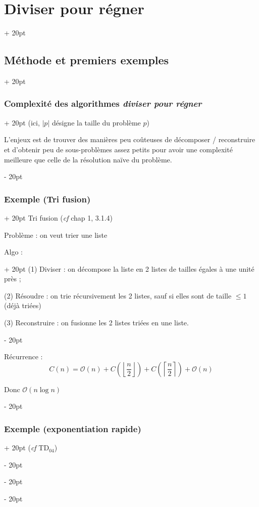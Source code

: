 \documentclass[a4paper, 12pt, twoside]{article}
\newcommand{\lr}[1]{\left( #1 \right)}
\newcommand{\abs}[1]{\left\lvert #1 \right\rvert} %
\newcommand{\floor}[1]{\left\lfloor #1 \right\rfloor}
\newcommand{\ceil}[1]{\left\lceil #1 \right\rceil}
\renewcommand{\le}{\leqslant}
\newcommand{\ind}[1][20pt]{\advance\leftskip + #1}
\newcommand{\deind}[1][20pt]{\advance\leftskip - #1}
\newenvironment{indt}[2][20pt]{#2 \par \ind[#1]}{\par \deind} %
\begin{document}
\begin{indt}{\section{Diviser pour régner}}
\begin{indt}{\subsection{Méthode et premiers exemples}}
\begin{indt}{\subsubsection{Complexité des algorithmes \textit{diviser pour régner}}}
                (ici, $\abs p$ désigne la taille du problème $p$)
                
                L'enjeux est de trouver des manières peu coûteuses de décomposer / reconstruire et d'obtenir peu de sous-problèmes assez petits pour avoir une complexité meilleure que celle de la résolution naïve du problème.
            \end{indt}
            
            \vspace{12pt}
            
            \begin{indt}{\subsubsection{Exemple (Tri fusion)}}
                Tri fusion (\textit{cf} chap 1, 3.1.4)
                
                \vspace{6pt}
                
                Problème : on veut trier une liste
                
                \vspace{6pt}
                
                \begin{indt}{Algo :}
                    (1) Diviser : on décompose la liste en 2 listes de tailles égales à une unité près ;
                    
                    (2) Résoudre : on trie récursivement les 2 listes, sauf si elles sont de taille $\le 1$ (déjà triées)
                    
                    (3) Reconstruire : on fusionne les 2 listes triées en une liste.
                \end{indt}
                
                \vspace{6pt}
                
                Récurrence :
                    \[ C(n) = \mathcal O(n) + C\lr{\floor{\dfrac n 2}} + C\lr{\ceil{\dfrac n 2}} + \mathcal O(n) \]
                
                Donc $\mathcal O(n \log n)$
            \end{indt}
            
            \vspace{12pt}
            
            \begin{indt}{\subsubsection{Exemple (exponentiation rapide)}}
                (\textit{cf} TD$_{04}$)
                

\end{indt}
\end{indt}
\end{indt}
\end{document}
